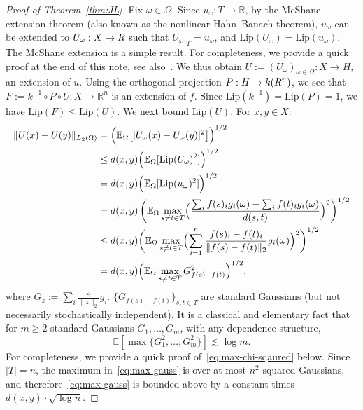 \documentclass{amsart}
\newcommand{\Lip}{\mathrm{Lip}}
\newcommand{\R}{\mathbb R}
\newcommand{\E}{\mathbb E}
\begin{document}
\begin{proof}[Proof of Theorem~\ref{thm:JL}]
    Fix $\omega\in \Omega$. 
    Since $u_\omega:T\to \R$,
    by the McShane extension theorem (also known as the nonlinear Hahn--Banach theorem), 
    $u_\omega$ can be extended to  $U_\omega :X\to \mathbb \R$ 
    such that $U_\omega|_T=u_\omega$, and
    $\Lip(U_\omega)=\Lip(u_\omega)$.
    The McShane extension is a simple result. 
    For completeness, we provide a quick proof at the end of this note, see also~\cite[Theorem~1.33]{Weaver-Lip}.
    We thus obtain $U:=(U_\omega)_{\omega\in\Omega}:X\to H$, an extension of $u$.
    Using the orthogonal projection $P:H\to k(\mathbb \R^n)$,    
    we see that $F:=k^{-1}\circ P\circ U:X\to \R^n$ is an extension of $f$. Since 
    $\Lip(k^{-1})=\Lip(P)=1$, we have $\Lip(F) \le \Lip(U)$.
    We next bound $\Lip(U)$. For $x,y\in X$:
    \begin{align}
\nonumber    \| U(x)-U(y)\|_{L_2(\Omega)} &=
    \Bigl (\E_\Omega \bigl [|U_\omega(x)-U_\omega(y)|^2 \bigr ]\Bigr )^{1/2} \\
\nonumber    &\le d(x,y) \Bigl (\E_\Omega [\Lip(U_\omega)^2]\Bigr )^{1/2} \\
\nonumber    & = d(x,y) \Bigl (\E_\Omega [\Lip(u_\omega)^2]\Bigr )^{1/2} \\
\nonumber & =
d(x,y) \left ( 
\E_\Omega \max_{s\ne t\in T} \Bigl(\frac{\sum_i f(s)_i g_i(\omega)- \sum_i f(t)_i g_i(\omega)}{d(s,t)}\Bigr)^2
\right)^{1/2}
\\ 
\nonumber &\le d(x,y)\biggl ( 
\E_\Omega \max_{s\ne t\in T} \Bigl(\sum_{i=1}^n \frac{ f(s)_i-f(t)_i}{\|f(s)-f(t)\|_2} g_i(\omega)\Bigr)^2
\biggr)^{1/2}
\\ \label{eq:max-gauss} &= d(x,y)\Bigl ( 
\E_\Omega \max_{ s\ne t\in T}  G_{f(s)-f(t)}^2 \Bigr)^{1/2},
 \end{align}
where $G_{z}:= \sum_i \frac{z_i}{\|z\|_2} g_i$. $\{G_{f(s)-f(t)}\}_{s,t\in T}$ are standard Gaussians (but not necessarily stochastically independent).
It is a classical and elementary fact that for $m\ge 2$ standard Gaussians $G_1,\ldots, G_m$, with any dependence structure, 
\begin{equation} \label{eq:max-chi-sqaured}
\E [\max\{G_1^2,\ldots, G_m^2\}] \lesssim  \log m.
\end{equation} 
For completeness, we provide a quick proof of~\eqref{eq:max-chi-sqaured} below.
Since $|T|=n$, the maximum  in~\eqref{eq:max-gauss} is over at most $n^2$ squared Gaussians, and therefore~\eqref{eq:max-gauss} is bounded above by a constant times $d(x,y) \cdot \sqrt{\log n}$.
\end{proof}
 
\end{document}
